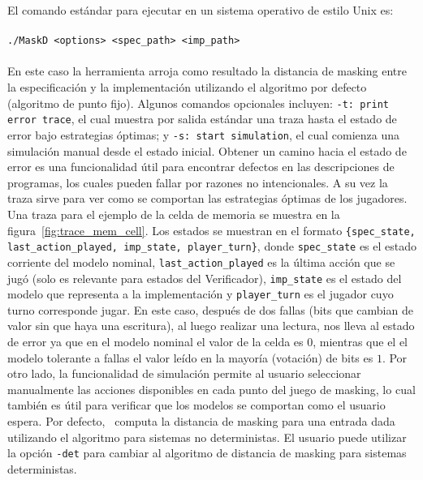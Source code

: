 El comando estándar para ejecutar {\MaskD} en un sistema operativo de estilo Unix es:
\\ 
\\
 \verb"./MaskD <options> <spec_path> <imp_path>"
\\
\\
En este caso la herramienta arroja como resultado la distancia de masking entre la especificación y la implementación utilizando el algoritmo por defecto (algoritmo de punto fijo).
Algunos comandos opcionales incluyen: \verb"-t: print error trace", el cual muestra por salida estándar una traza hasta el estado de error bajo estrategias óptimas; y  \verb"-s: start simulation", el cual comienza una simulación manual desde el estado inicial.  
Obtener un camino hacia el estado de error es una funcionalidad útil para encontrar defectos en las descripciones de programas, los cuales pueden fallar por razones no intencionales. A su vez la traza sirve para ver como se comportan las estrategias óptimas de los jugadores. Una traza para el ejemplo de la celda de memoria se muestra en la figura~\ref{fig:trace_mem_cell}. Los estados se muestran en el formato \verb"{spec_state, last_action_played, imp_state, player_turn}", donde \verb"spec_state" es el estado corriente del modelo nominal, \verb"last_action_played" es la última acción que se jugó (solo es relevante para estados del Verificador), \verb"imp_state" es el estado del modelo que representa a la implementación y \verb"player_turn" es el jugador cuyo turno corresponde jugar. En este caso, después de dos fallas (bits que cambian de valor sin que haya una escritura), al luego realizar una lectura, nos lleva al estado de error ya que en el modelo nominal el valor de la celda es $0$, mientras que el el modelo tolerante a fallas el valor leído en la mayoría (votación) de bits es $1$. Por otro lado, la funcionalidad de simulación permite al usuario seleccionar manualmente las acciones disponibles en cada punto del juego de masking, lo cual también es útil para verificar que los modelos se comportan como el usuario espera.
Por defecto, \MaskD~computa la distancia de masking para una entrada dada utilizando el algoritmo para sistemas no deterministas. 
El usuario puede utilizar la opción \verb"-det" para cambiar al algoritmo de distancia de masking para sistemas deterministas.
